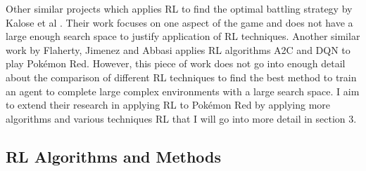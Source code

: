 Other similar projects which applies RL to find the optimal battling strategy by Kalose et al \cite{kalose2018optimal}. 
Their work focuses on one aspect of the game and does not have a large enough search space to justify application of RL techniques. 
Another similar work by Flaherty, Jimenez and Abbasi \cite{flaherty2021playing} applies RL algorithms A2C and DQN to play Pokémon 
Red. However, this piece of work does not go into enough detail about the comparison of different RL techniques to find the best
 method to train an agent to complete large complex environments with a large search space. I aim to extend their research in 
 applying RL to Pokémon Red by applying more algorithms and various techniques RL that I will go into more detail in section 3.

\subsection{RL Algorithms and Methods}